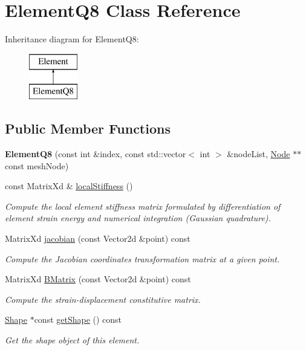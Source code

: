 \hypertarget{class_element_q8}{}\section{Element\+Q8 Class Reference}
\label{class_element_q8}
Inheritance diagram for Element\+Q8\+:\begin{figure}[H]
\begin{center}
\leavevmode
\includegraphics[height=2.000000cm]{class_element_q8}
\end{center}
\end{figure}
\subsection*{Public Member Functions}
\begin{DoxyCompactItemize}
\item 
\mbox{\label{class_element_q8_a62c1f93cb438055e8412b3f957e72a20}} 
{\bfseries Element\+Q8} (const int \&index, const std\+::vector$<$ int $>$ \&node\+List, \mbox{\hyperlink{class_node}{Node}} $\ast$$\ast$const mesh\+Node)
\item 
const Matrix\+Xd \& \mbox{\hyperlink{class_element_q8_afc898e404f9abb5a5a4d74eee54476b7}{local\+Stiffness}} ()
\begin{DoxyCompactList}\small\item\em Compute the local element stiffness matrix formulated by differentiation of element strain energy and numerical integration (Gaussian quadrature). \end{DoxyCompactList}\item 
Matrix\+Xd \mbox{\hyperlink{class_element_q8_ae23bf98a466daa224224da495d5724ff}{jacobian}} (const Vector2d \&point) const
\begin{DoxyCompactList}\small\item\em Compute the Jacobian coordinates transformation matrix at a given point. \end{DoxyCompactList}\item 
Matrix\+Xd \mbox{\hyperlink{class_element_q8_afb41facf96d5bb4be5162724699e3e02}{B\+Matrix}} (const Vector2d \&point) const
\begin{DoxyCompactList}\small\item\em Compute the strain-\/displacement constitutive matrix. \end{DoxyCompactList}\item 
\mbox{\hyperlink{class_shape}{Shape}} $\ast$const \mbox{\hyperlink{class_element_q8_a06118e8d0c0a0cb247c249f22e11eeaf}{get\+Shape}} () const
\begin{DoxyCompactList}\small\item\em Get the shape object of this element. \end{DoxyCompactList}\end{DoxyCompactItemize}

